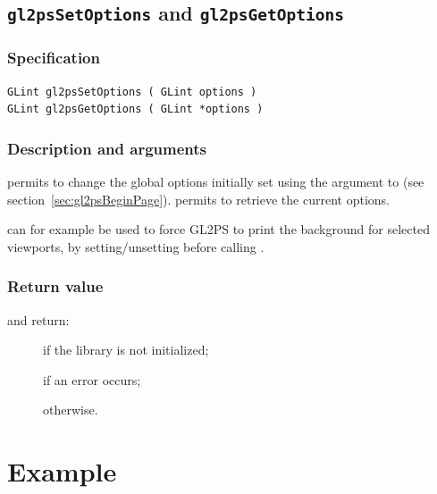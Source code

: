 
\subsection{\texttt{gl2psSetOptions} and \texttt{gl2psGetOptions}}
\label{sec:gl2psSetOptions}

\subsubsection{Specification}

\begin{verbatim}
GLint gl2psSetOptions ( GLint options )
GLint gl2psGetOptions ( GLint *options )
\end{verbatim}

\subsubsection{Description and arguments}

 permits to change the global options initially
set using the  argument to  (see
section~\ref{sec:gl2psBeginPage}).  permits to
retrieve the current options.

 can for example be used to force GL2PS to print
the background for selected viewports, by setting/unsetting
 before calling .

\subsubsection{Return value}

\noindent{} and  return:
\begin{description}
\item[] if the library is not initialized;
\item[] if an error occurs;
\item[] otherwise.
\end{description}


\section{Example}

